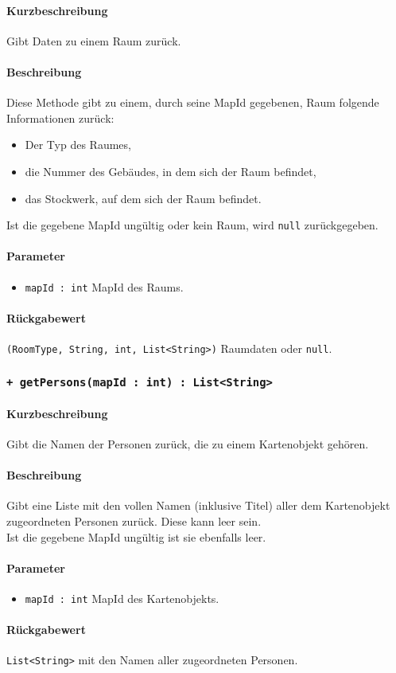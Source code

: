 \paragraph*{Kurzbeschreibung}
Gibt Daten zu einem Raum zurück.
\paragraph*{Beschreibung}
Diese Methode gibt zu einem, durch seine MapId gegebenen, Raum folgende Informationen zurück:
\begin{itemize}
    \item Der Typ des Raumes,
    \item die Nummer des Gebäudes, in dem sich der Raum befindet,
    \item das Stockwerk, auf dem sich der Raum befindet.
\end{itemize}
Ist die gegebene MapId ungültig oder kein Raum, wird \texttt{null} zurückgegeben.
\paragraph*{Parameter}
\begin{itemize}
    \item \texttt{mapId : int} MapId des Raums.
\end{itemize}
\paragraph*{Rückgabewert}
\texttt{(RoomType, String, int, List<String>)} Raumdaten oder \texttt{null}.

\subsubsection*{\texttt{+ getPersons(mapId : int) : List<String>}}\label{App_Map_Model_getPersons_IMap}%
\paragraph*{Kurzbeschreibung}
Gibt die Namen der Personen zurück, die zu einem Kartenobjekt gehören.
\paragraph*{Beschreibung}
Gibt eine Liste mit den vollen Namen (inklusive Titel) aller dem Kartenobjekt zugeordneten 
Personen zurück. Diese kann leer sein.\\
Ist die gegebene MapId ungültig ist sie ebenfalls leer.
\paragraph*{Parameter}
\begin{itemize}
    \item \texttt{mapId : int} MapId des Kartenobjekts.
\end{itemize}
\paragraph*{Rückgabewert}
\texttt{List<String>} mit den Namen aller zugeordneten Personen.

